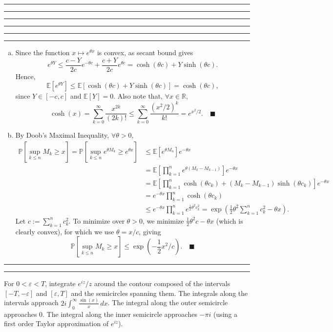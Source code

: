 \documentclass[11pt]{article}
\newcounter{questionCounter}
\newcounter{partCounter}[questionCounter]
\newenvironment{question}[2][\arabic{questionCounter}]{%
    \setcounter{partCounter}{0}%
    \vspace{.25in} \hrule \vspace{0.5em}%
        \noindent{\bf #2}%
    \vspace{0.8em} \hrule \vspace{.10in}%
    \addtocounter{questionCounter}{1}%
}{}
\renewcommand{\qed}{\quad \ensuremath{\blacksquare}}
\newcommand{\E}{\mathbb{E}} %
\newcommand{\R}{\mathbb{R}} %
\newcommand{\e}{\varepsilon} %
\renewcommand{\P}{\mathbb{P}}   %
\begin{document}
\begin{question}{E13.3}
\end{question}

\begin{question}{E14.1}
\end{question}

\begin{question}{E14.2}
\begin{enumerate}[(a)]
\item
Since the function $x \mapsto e^{\theta x}$ is convex, as secant bound
gives
\[e^{\theta Y}
    \leq \frac{c - Y}{2c}e^{-\theta c} + \frac{c + Y}{2c}e^{\theta c}
    = \cosh(\theta c) + Y\sinh(\theta c).
\]
Hence,
\[\E\left[ e^{\theta Y} \right]
    \leq \E\left[ \cosh(\theta c) + Y\sinh(\theta c) \right]
    = \cosh(\theta c),
\]
since $Y \in [-c,c]$ and $\E[Y] = 0$. Also note that, $\forall x \in \R$,
\[\cosh(x)
    = \sum_{k = 0}^\infty \frac{x^{2k}}{(2k)!}
    \leq \sum_{k = 0}^\infty \frac{(x^2/2)^k}{k!}
    = e^{x^2/2}. \qed
\]
\item By Doob's Maximal Inequality, $\forall \theta > 0$,
\begin{align*}
\P\left[ \sup_{k \leq n} M_k \geq x \right]
    = \P\left[ \sup_{k \leq n} e^{\theta M_k} \geq e^{\theta x} \right]
 &  \leq \E\left[ e^{\theta M_n} \right] e^{-\theta x}                      \\
 &  = \E\left[ \prod_{k = 1}^n e^{\theta (M_k - M_{k - 1})} \right]
                                                            e^{-\theta x}   \\
 &  = \E\left[ \prod_{k = 1}^n \cosh(\theta c_k)
                + (M_k - M_{k - 1})\sinh(\theta c_k) \right] e^{-\theta x}  \\
 &  = e^{-\theta x} \prod_{k = 1}^n \cosh(\theta c_k)                       \\
 &  \leq e^{-\theta x} \prod_{k = 1}^n e^{\frac12\theta^2 c_k^2}
    = \exp \left(\frac12 \theta^2 \sum_{k = 1}^n c_k^2 - \theta x  \right).
\end{align*}
Let $c := \sum_{k = 1}^n c_k^2$. To minimize over $\theta > 0$, we minimize
$\frac12\theta^2 c - \theta x$ (which is clearly convex),
for which we use $\theta = x/c$, giving
\[\P\left[ \sup_{k \leq n} M_k \geq x \right]
    \leq \exp \left( -\frac12x^2/c \right). \qed
\]
\end{enumerate}
\end{question}

\begin{question}{E16.1}
For $0 < \e < T$, integrate $e^{iz}/z$ around the contour composed of the
intervals $[-T,-\e]$ and $[\e,T]$ and the semicircles spanning them. The
integrals along the intervals approach
$2i\int_0^\infty \frac{\sin(x)}{x} \, dx$. The integral along the outer
semicircle approaches $0$. The integral along the inner semicircle approaches
$-\pi i$ (using a first order Taylor approximation of $e^{iz}$).
\end{question}
\end{document}
